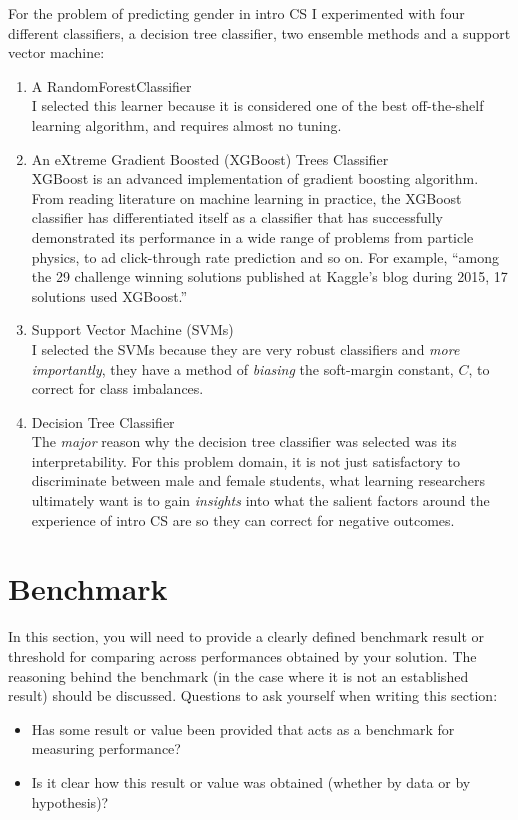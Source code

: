 \documentclass[twoside,openright,titlepage,numbers=noenddot,headinclude,%
               footinclude=true,cleardoublepage=empty,abstractoff,BCOR=5mm,%
               paper=a4,fontsize=11pt,ngerman,american]{scrreprt}
\numberwithin{theorem}{chapter}
\numberwithin{definition}{chapter}
\numberwithin{algorithm}{chapter}
\numberwithin{figure}{chapter}
\numberwithin{table}{chapter}
\numberwithin{equation}{chapter}
\begin{document}
For the problem of predicting gender in intro CS I experimented with four different classifiers, a decision tree classifier, two ensemble methods and a support vector machine:

\begin{enumerate}%
\item A RandomForestClassifier\\
I selected this learner because it is considered one of the best off-the-shelf learning algorithm, and requires almost no tuning. 
\item An eXtreme Gradient Boosted (XGBoost) Trees Classifier\\
XGBoost is an advanced implementation of gradient boosting algorithm. From reading literature on machine learning in practice, the XGBoost classifier has differentiated itself as a classifier that has successfully demonstrated its performance in a wide range of problems from particle physics, to ad click-through rate prediction and so on. For example, ``among the 29 challenge winning solutions published at Kaggle's blog during 2015, 17 solutions used XGBoost.''

\item Support Vector Machine (SVMs)\\
I selected the SVMs because they are very robust classifiers and \textit{more importantly}, they have a method of \textit{biasing} the soft-margin constant, $C$, to correct for class imbalances. 
              
\item Decision Tree Classifier\\
The \textit{major} reason why the decision tree classifier was selected was its interpretability. For this problem domain, it is not just satisfactory to discriminate between male and female students, what learning researchers ultimately want is to gain \textit{insights} into what the salient factors around the experience of intro CS are so they can correct for negative outcomes.

\end{enumerate}

\section*{Benchmark}

In this section, you will need to provide a clearly defined benchmark result or threshold for comparing across performances obtained by your solution. The reasoning behind the benchmark (in the case where it is not an established result) should be discussed. Questions to ask yourself when writing this section:
\begin{itemize}%
\item Has some result or value been provided that acts as a benchmark for measuring performance?
\item Is it clear how this result or value was obtained (whether by data or by hypothesis)?
\end{itemize}
\end{document}
